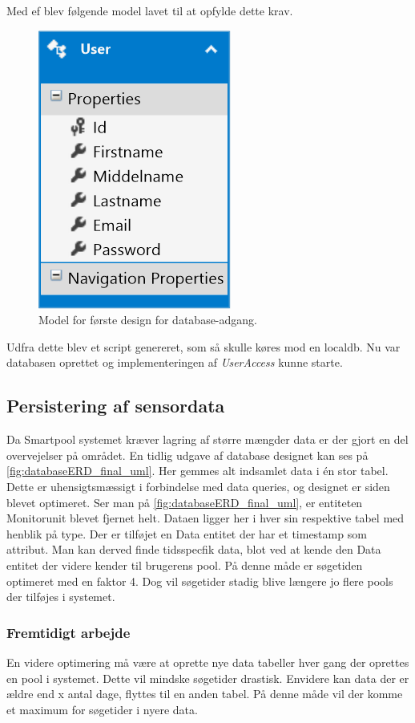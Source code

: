 Med \gls{ef} blev følgende model lavet til at opfylde dette krav.

\begin{figure}[h]
	\centering
	\includegraphics[width=0.25\linewidth]{figs/design/database_model_1}
	\caption{Model for første design for database-adgang.}
	\label{fig:database_model_1}
\end{figure}

Udfra dette blev et script genereret, som så skulle køres mod en localdb. Nu var databasen oprettet og implementeringen af \textit{UserAccess} kunne starte.

\subsection{Persistering af sensordata}
Da Smartpool systemet kræver lagring af større mængder data er der gjort en del overvejelser på området. En tidlig udgave af database designet kan ses på \ref{fig:databaseERD_final_uml}. Her gemmes alt indsamlet data i én stor tabel. Dette er uhensigtsmæssigt i forbindelse med data queries, og designet er siden blevet optimeret. Ser man på \ref{fig:databaseERD_final_uml}, er entiteten Monitorunit blevet fjernet helt. Dataen ligger her i hver sin respektive tabel med henblik på type. Der er tilføjet en Data entitet der har et timestamp som attribut. Man kan derved finde tidsspecfik data, blot ved at kende den Data entitet der videre kender til brugerens pool. På denne måde er søgetiden optimeret med en faktor 4. Dog vil søgetider stadig blive længere jo flere pools der tilføjes i systemet.

\subsubsection{Fremtidigt arbejde}
En videre optimering må være at oprette nye data tabeller hver gang der oprettes en pool i systemet. Dette vil mindske søgetider drastisk. Envidere kan data der er ældre end x antal dage, flyttes til en anden tabel. På denne måde vil der komme et maximum for søgetider i nyere data.

